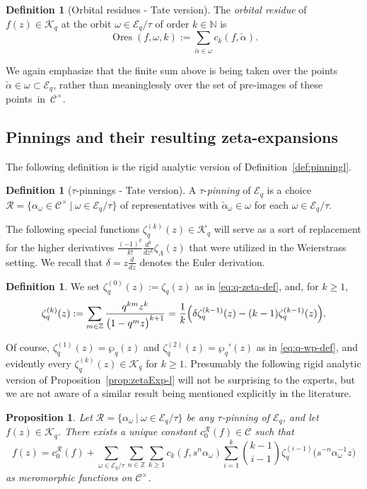 \documentclass[preprint,12pt]{elsarticle}
\numberwithin{equation}{section} %
\theoremstyle{theorem}
\newtheorem{proposition}[theorem]{Proposition}
\theoremstyle{definition}
\newtheorem{definition}[theorem]{Definition}
\newcommand{\Cq}{\mathcal{C}} %
\newcommand{\bk}{\mathcal{K}} %
\newcommand{\bkq}{\bk_{q}} %
\newcommand{\ec}{\mathcal{E}} %
\newcommand{\ecq}{\ec_{q}}
\newcommand{\orbitq}{{\ecq/\tau}} %
\newcommand{\Z}{\mathbb{Z}} %
\newcommand{\zl}{\zeta_{\Lambda}}
\newcommand{\zq}{\zeta_{q}}
\newcommand{\zqd}[1]{\zq^{({#1})}} %
\DeclareMathOperator{\ores}{Ores}
\begin{document}
\begin{definition}[Orbital residues - Tate version]\label{def:oresq} The \emph{orbital residue} of $f(z)\in\bkq$ at the orbit $\omega\in\orbitq$ of order $k\in\mathbb{N}$ is \[\ores(f,\omega,k):=\sum_{\check{\alpha}\in\omega}c_k(f,\check{\alpha}).\]
\end{definition}


We again emphasize that the finite sum above is being taken over the points $\check{\alpha}\in\omega\subset\ecq$, rather than meaninglessly over the set of pre-images of these \mbox{points in~$\Cq^\times$.}

\subsection{Pinnings and their resulting zeta-expansions}

The following definition is the rigid analytic version of Definition~\ref{def:pinningl}.

\begin{definition}[$\tau$-pinnings - Tate version]\label{def:pinningq}
    A $\tau$-\emph{pinning} of $\ecq$ is a choice $\mathcal{R}=\{\alpha_\omega \in\Cq^\times\ | \ \omega\in\orbitq\}$ of representatives with $\check{\alpha}_\omega\in\omega$ for each $\omega\in\orbitq$.
\end{definition}

The following special functions $\zqd{k}(z) \in\bkq$ will serve as a sort of replacement for the higher derivatives $\frac{(-1)^k}{k!}\frac{d^k}{dz^k}\zl(z)$ that were utilized in the Weierstrass setting. We recall that $\delta=z\frac{d}{dz}$ denotes the Euler derivation.

\begin{definition}\label{def:q-zeta-fake-derivatives}
    We set $\zqd{0}(z):=\zq(z)$ as in \eqref{eq:q-zeta-def}, and, for $k\geq 1$, \[\zqd{k}(z):=\sum_{m\in\Z}\frac{q^{km}z^k}{\bigl(1-q^mz\bigr)^{k+1}}=\frac{1}{k}\Bigl(\delta\zqd{k-1}(z)-(k-1)\zqd{k-1}(z)\Bigr).\]
\end{definition}

Of course, $\zqd{1}(z)=\wp_q(z)$ and $\zqd{2}(z)=\wp_q'(z)$ as in \eqref{eq:q-wp-def}, and evidently every $\zqd{k}(z)\in\bkq$ for $k\geq 1$. Presumably the following rigid analytic version of Proposition~\ref{prop:zetaExp-l} will not be surprising to the experts, but we are not aware of a similar result being mentioned explicitly in the literature.

\begin{proposition}\label{prop:zetaExp-q}
    Let $\mathcal{R}=\{\alpha_\omega \ | \ \omega\in\orbitq\}$ be any $\tau$-pinning of $\ecq$, and let $f(z)\in\bkq$. There exists a unique constant $c_0^\mathcal{R}(f)\in\Cq$ such that
    \begin{equation} \label{eq:zetaExp-q}
        f(z) = c_0^{\mathcal{R}}(f)+\sum_{\omega\in\orbitq}\sum_{n\in\mathbb{Z}}\sum_{k\geq 1}c_k(f,s^n\alpha_\omega)\sum_{i=1}^k\binom{k-1}{i-1}\zqd{i-1}\bigl(s^{-n}\alpha_\omega^{-1}z\bigr)
    \end{equation} as meromorphic functions on $\Cq^\times$.
\end{proposition}
\end{document}
